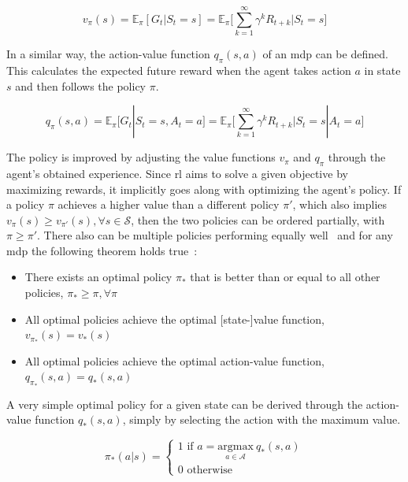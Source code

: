 \documentclass[draft,final]{vutinfth} %
\newcommand{\p}[1]{see p. #1}
\begin{document}
    \begin{equation}
        v_\pi(s) = \mathbb{E}_\pi[G_t|S_t = s] = \mathbb{E}_\pi \Bigg[\sum_{k=1}^{\infty} \gamma^k R_{t+k} \bigg| S_t = s \Bigg]\label{eq:value_function}
    \end{equation}

    In a similar way, the action-value function $q_\pi(s,a)$ of an \gls{mdp} can be defined.
    This calculates the expected future reward when the agent takes action $a$ in state $s$ and then follows the policy $\pi$.

    \begin{equation}
        q_\pi(s,a) = \mathbb{E}_\pi[G_t|S_t = s, A_t = a] = \mathbb{E}_\pi \Bigg[\sum_{k=1}^{\infty} \gamma^k R_{t+k} \bigg| S_t = s | A_t = a \Bigg]\label{eq:quality_function}
    \end{equation}

    The policy is improved by adjusting the value functions $v_\pi$ and $q_\pi$ through the agent's obtained experience.
    Since \gls{rl} aims to solve a given objective by maximizing rewards, it implicitly goes along with optimizing the agent's policy.
    If a policy $\pi$ achieves a higher value than a different policy $\pi'$, which also implies $v_\pi(s) \geq v_{\pi'}(s), \forall s \in \mathcal{S}$, then the two policies can be ordered partially, with $\pi \geq \pi'$.
    There also can be multiple policies performing equally well~\citep[\p{62f}]{sutton_reinforcement_2018} and for any \gls{mdp} the following theorem holds true~\citepOnline[\p{43}]{silver_lecture_2015-1}:

    \begin{itemize}
        \item There exists an optimal policy $\pi_*$ that is better than or equal to all other policies, $\pi_* \geq \pi, \forall\pi$
        \item All optimal policies achieve the optimal [state-]value function, $v_{\pi_*}(s) = v_*(s)$
        \item All optimal policies achieve the optimal action-value function, $q_{\pi_*}(s,a) = q_*(s,a)$
    \end{itemize}

    A very simple optimal policy for a given state can be derived through the action-value function $q_*(s,a)$, simply by selecting the action with the maximum value.

    \begin{equation}
        \pi_*(a|s) =
        \begin{cases}
            1 \text{ if } a =  \underset{a \in \mathcal{A}}{\text{argmax}}\ q_*(s,a)\\
            0 \text{ otherwise }
        \end{cases}
    \end{equation}
\end{document}
